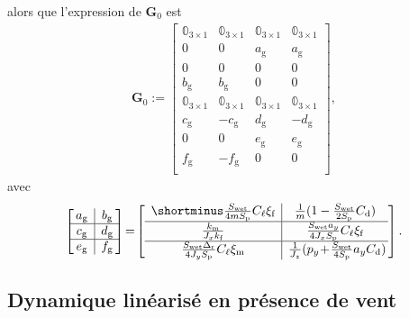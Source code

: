 alors que l'expression de $\boldsymbol{G}_{0}$ est
\begin{align*}
    \boldsymbol{G}_{0}  := \begin{bmatrix}
    \mathbb{0}_{3\times 1} & \mathbb{0}_{3\times 1} & \mathbb{0}_{3\times 1} & \mathbb{0}_{3\times 1}\\
    0 & 0 & a_{\text{g}} & a_{\text{g}}\\
    0 & 0 & 0 & 0\\
    b_{\text{g}} & b_{\text{g}}  & 0 & 0\\
    \mathbb{0}_{3\times 1} & \mathbb{0}_{3\times 1} & \mathbb{0}_{3\times 1} & \mathbb{0}_{3\times 1}\\
    c_{\text{g}} & -c_{\text{g}} & d_{\text{g}} & -d_{\text{g}}\\
    0 & 0 & e_{\text{g}} & e_{\text{g}}\\
    f_{\text{g}} & -f_{\text{g}} & 0 & 0\\
    \end{bmatrix} , 
\end{align*}
avec
\begin{align*}
    \left[\!\! \begin{array}{c|c} 
    a_{\text{g}} & b_{\text{g}} \\ \hline
    c_{\text{g}} & d_{\text{g}} \\ \hline
    e_{\text{g}} & f_{\text{g}}
    \end{array} \!\!\right] \!=\!
    \left[\begin{array}{c|c}
   \shortminus \frac{S_{\text{wet}}}{4mS_{\text{p}}}C_{\ell}\xi_{\text{f}}  & \frac{1}{m}( 1-\frac{S_{\text{wet}}}{2S_{\text{p}}} C_{\text{d}}) \\ \hline
    \frac{k_{\text{m}} }{J_{x}k_{\text{f}}}  &   \! \frac{ S_{\text{wet}} a_{y} }{4 J_{x} S_{\text{p}} } C_{\ell}\xi_{\text{f}} \!\\ \hline
    \!\! \frac{S_{\text{wet}}\Delta_{\text{r}}}{4J_{y}S_{\text{p}}} C_{\ell}\xi_{\text{m}} \!\! & 
    \frac{1}{J_{z}}(p_{y}\!+\!\frac{S_{\text{wet}}}{4S_{\text{p}}} a_{y} C_{\text{d}})\!\!
    \end{array}\right].
\end{align*}

\subsection{Dynamique linéarisé en présence de vent}

